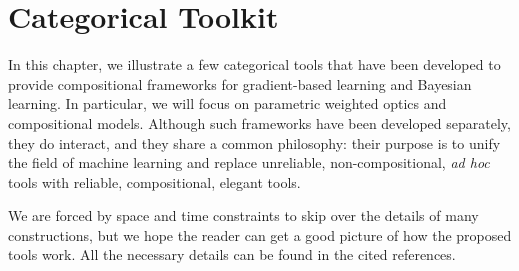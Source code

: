\documentclass[12pt,a4paper,openright,twoside]{report}
\theoremstyle{plain}
\theoremstyle{definition}
\begin{document}
\tableofcontents
\rhead[\fancyplain{}{\bfseries\leftmark}]{\fancyplain{}{\bfseries\thepage}} 
\clearpage{\pagestyle{empty}\cleardoublepage}
































































\chapter{Categorical Toolkit}
\lhead[\fancyplain{}{\bfseries\thepage}]{\fancyplain{}{\bfseries\rightmark}}

In this chapter, we illustrate a few categorical tools that have been developed to provide compositional frameworks for gradient-based learning and Bayesian learning. In particular, we will focus on parametric weighted optics and compositional models. Although such frameworks have been developed separately, they do interact, and they share a common philosophy: their purpose is to unify the field of machine learning and replace unreliable, non-compositional, \textit{ad hoc} tools with reliable, compositional, elegant tools.


We are forced by space and time constraints to skip over the details of many constructions, but we hope the reader can get a good picture of how the proposed tools work. All the necessary details can be found in the cited references.
\end{document}
